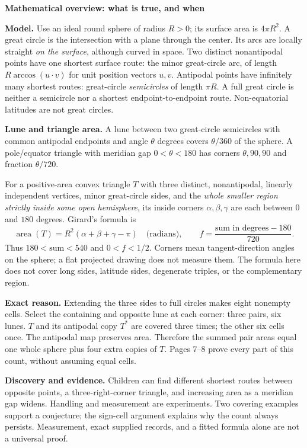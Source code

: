 \documentclass[11pt,letterpaper]{article}
\newcommand{\topic}[1]{\par{\large\bfseries\color{blue}#1}\par}
\begin{document}
\topic{Mathematical overview: what is true, and when}
\textbf{Model.} Use an ideal round sphere of radius $R>0$; its surface area is $4\pi R^2$. A great circle is the intersection with a plane through the center. Its arcs are locally straight \emph{on the surface}, although curved in space. Two distinct nonantipodal points have one shortest surface route: the minor great-circle arc, of length $R\arccos(u\cdot v)$ for unit position vectors $u,v$. Antipodal points have infinitely many shortest routes: great-circle \emph{semicircles} of length $\pi R$. A full great circle is neither a semicircle nor a shortest endpoint-to-endpoint route. Non-equatorial latitudes are not great circles.

\textbf{Lune and triangle area.} A lune between two great-circle semicircles with common antipodal endpoints and angle $\theta$ degrees covers $\theta/360$ of the sphere. A pole/equator triangle with meridian gap $0<\theta<180$ has corners $\theta,90,90$ and fraction $\theta/720$.

For a positive-area convex triangle $T$ with three distinct, nonantipodal, linearly independent vertices, minor great-circle sides, and the \emph{whole smaller region strictly inside some open hemisphere}, its inside corners $\alpha,\beta,\gamma$ are each between $0$ and $180$ degrees. Girard's formula is
\[
  \operatorname{area}(T)=R^2(\alpha+\beta+\gamma-\pi)\quad\text{(radians)},
  \qquad f=\frac{\text{sum in degrees}-180}{720}.
\]
Thus $180<\text{sum}<540$ and $0<f<1/2$. Corners mean tangent-direction angles on the sphere; a flat projected drawing does not measure them. The formula here does not cover long sides, latitude sides, degenerate triples, or the complementary region.

\textbf{Exact reason.} Extending the three sides to full circles makes eight nonempty cells. Select the containing and opposite lune at each corner: three pairs, six lunes. $T$ and its antipodal copy $T^*$ are covered three times; the other six cells once. The antipodal map preserves area. Therefore the summed pair areas equal one whole sphere plus four extra copies of $T$. Pages 7--8 prove every part of this count, without assuming equal cells.

\textbf{Discovery and evidence.} Children can find different shortest routes between opposite points, a three-right-corner triangle, and increasing area as a meridian gap widens. Handling and measurement are experiments. Two covering examples support a conjecture; the sign-cell argument explains why the count always persists. Measurement, exact supplied records, and a fitted formula alone are not a universal proof.
\end{document}
